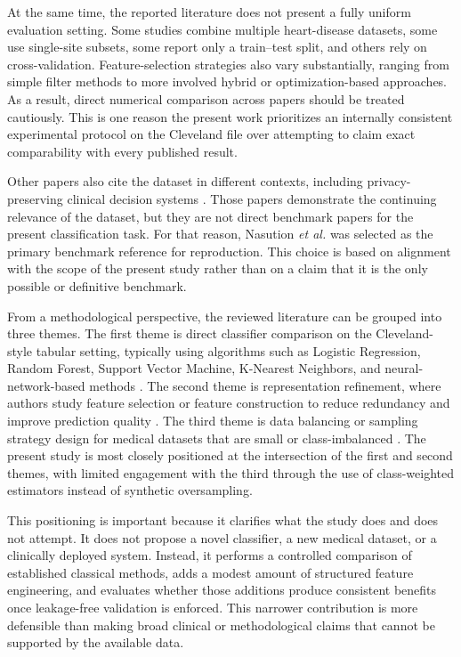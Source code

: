 \documentclass[conference]{IEEEtran}
\begin{document}
At the same time, the reported literature does not present a fully uniform evaluation setting. Some studies combine multiple heart-disease datasets, some use single-site subsets, some report only a train--test split, and others rely on cross-validation. Feature-selection strategies also vary substantially, ranging from simple filter methods to more involved hybrid or optimization-based approaches. As a result, direct numerical comparison across papers should be treated cautiously. This is one reason the present work prioritizes an internally consistent experimental protocol on the Cleveland file over attempting to claim exact comparability with every published result.

Other papers also cite the dataset in different contexts, including privacy-preserving clinical decision systems \cite{ma2019ppcd}. Those papers demonstrate the continuing relevance of the dataset, but they are not direct benchmark papers for the present classification task. For that reason, Nasution \textit{et al.} \cite{nasution2025heart} was selected as the primary benchmark reference for reproduction. This choice is based on alignment with the scope of the present study rather than on a claim that it is the only possible or definitive benchmark.

From a methodological perspective, the reviewed literature can be grouped into three themes. The first theme is direct classifier comparison on the Cleveland-style tabular setting, typically using algorithms such as Logistic Regression, Random Forest, Support Vector Machine, K-Nearest Neighbors, and neural-network-based methods \cite{nasution2025heart,akella2021cad,rabbi2018performance}. The second theme is representation refinement, where authors study feature selection or feature construction to reduce redundancy and improve prediction quality \cite{spencer2020feature,rehman2025mi}. The third theme is data balancing or sampling strategy design for medical datasets that are small or class-imbalanced \cite{albert2023oversampling,muhammad2021smote}. The present study is most closely positioned at the intersection of the first and second themes, with limited engagement with the third through the use of class-weighted estimators instead of synthetic oversampling.

This positioning is important because it clarifies what the study does and does not attempt. It does not propose a novel classifier, a new medical dataset, or a clinically deployed system. Instead, it performs a controlled comparison of established classical methods, adds a modest amount of structured feature engineering, and evaluates whether those additions produce consistent benefits once leakage-free validation is enforced. This narrower contribution is more defensible than making broad clinical or methodological claims that cannot be supported by the available data.
\end{document}
